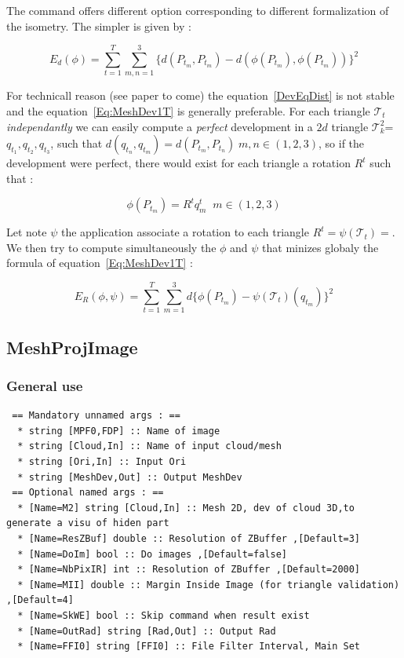 The command offers different option corresponding to different formalization of the isometry.
The simpler is given by :

\begin{equation}
   E_d(\phi) =   \sum_{t=1}^T \sum_{m,n=1}^3  \{ d(P_{t_m},P_{t_m})-  d(\phi(P_{t_m}),\phi(P_{t_m})) \}  ^2
   \label{DevEqDist}
\end{equation}

For technicall reason (see paper to come) the equation~\ref{DevEqDist} is not stable and
the equation~\ref{Eq:MeshDev1T} is generally preferable.
For each triangle  $\mathcal{T}_t$ \emph{independantly} we can easily compute a \emph{perfect} development
in a $2d$ triangle $\mathcal{T}^2_k$= $q_{t_1},q_{t_2},q_{t_3}$, such that 
$d(q_{t_n},q_{t_m})=d(P_{t_m},P_{t_n}) \; m,n \in (1,2,3)$, so if the development
were perfect, there would exist for each triangle a rotation $R^t$ such that :

\begin{equation}
	\phi(P_{t_m}) =  R^t q^t_m  \;\; m \in (1,2,3) \label{Eq:MeshDev1T}
\end{equation}


Let note $\psi$ the application associate a rotation to each triangle $R^t = \psi(\mathcal{T}_t)=$.
We then try to compute simultaneously the $\phi$ and $\psi$ that minizes globaly the 
formula of equation~\ref{Eq:MeshDev1T} :

\begin{equation}
    E_R(\phi,\psi)= \sum_{t=1}^T \sum_{m=1}^3  d\{\phi(P_{t_m}) - \psi(\mathcal{T}_t)(q_{t_m})\} ^2
\end{equation}


\subsection{MeshProjImage}

\subsubsection{General use}

\begin{verbatim}
 == Mandatory unnamed args : ==
  * string [MPF0,FDP] :: Name of image
  * string [Cloud,In] :: Name of input cloud/mesh
  * string [Ori,In] :: Input Ori
  * string [MeshDev,Out] :: Output MeshDev
 == Optional named args : ==
  * [Name=M2] string [Cloud,In] :: Mesh 2D, dev of cloud 3D,to generate a visu of hiden part
  * [Name=ResZBuf] double :: Resolution of ZBuffer ,[Default=3]
  * [Name=DoIm] bool :: Do images ,[Default=false]
  * [Name=NbPixIR] int :: Resolution of ZBuffer ,[Default=2000]
  * [Name=MII] double :: Margin Inside Image (for triangle validation) ,[Default=4]
  * [Name=SkWE] bool :: Skip command when result exist
  * [Name=OutRad] string [Rad,Out] :: Output Rad
  * [Name=FFI0] string [FFI0] :: File Filter Interval, Main Set
\end{verbatim}

